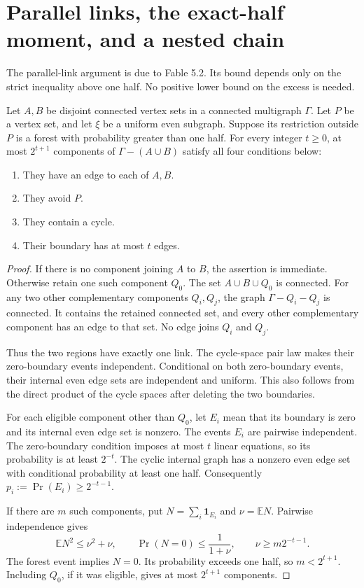 \section{Parallel links, the exact-half moment, and a nested chain}
\label{sec:sharp-parallel-links}

The parallel-link argument is due to Fable 5.2.
Its bound depends only on the strict inequality above one half.
No positive lower bound on the excess is needed.

\begin{lemma}
\label{lem:endpoint-parallel-links}
Let $A,B$ be disjoint connected vertex sets in a connected multigraph $\Gamma$.
Let $P$ be a vertex set, and let $\xi$ be a uniform even subgraph.
Suppose its restriction outside $P$ is a forest with probability greater than one half.
For every integer $t\ge0$, at most $2^{t+1}$ components of $\Gamma-(A\cup B)$ satisfy all four conditions below:
\begin{enumerate}
\item They have an edge to each of $A,B$.
\item They avoid $P$.
\item They contain a cycle.
\item Their boundary has at most $t$ edges.
\end{enumerate}
\end{lemma}

\begin{proof}
If there is no component joining $A$ to $B$, the assertion is immediate.
Otherwise retain one such component $Q_0$.
The set $A\cup B\cup Q_0$ is connected.
For any two other complementary components $Q_i,Q_j$, the graph $\Gamma-Q_i-Q_j$ is connected.
It contains the retained connected set, and every other complementary component has an edge to that set.
No edge joins $Q_i$ and $Q_j$.

Thus the two regions have exactly one link.
The cycle-space pair law makes their zero-boundary events independent.
Conditional on both zero-boundary events, their internal even edge sets are independent and uniform.
This also follows from the direct product of the cycle spaces after deleting the two boundaries.

For each eligible component other than $Q_0$, let $E_i$ mean that its boundary is zero and its internal even edge set is nonzero.
The events $E_i$ are pairwise independent.
The zero-boundary condition imposes at most $t$ linear equations, so its probability is at least $2^{-t}$.
The cyclic internal graph has a nonzero even edge set with conditional probability at least one half.
Consequently $p_i:=\Pr(E_i)\ge2^{-t-1}$.

If there are $m$ such components, put $N=\sum_i\mathbf1_{E_i}$ and $\nu=\mathbb EN$.
Pairwise independence gives
\[
 \mathbb EN^2\le\nu^2+\nu,\qquad
 \Pr(N=0)\le\frac1{1+\nu},\qquad
 \nu\ge m2^{-t-1}.
\]
The forest event implies $N=0$.
Its probability exceeds one half, so $m<2^{t+1}$.
Including $Q_0$, if it was eligible, gives at most $2^{t+1}$ components.
\end{proof}


